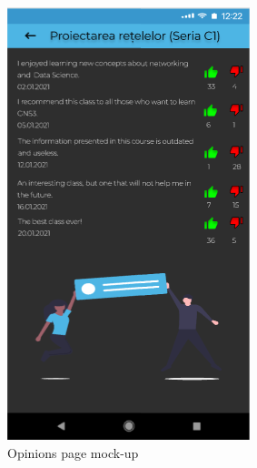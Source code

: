     \begin{figure}[!ht]
        \centering
        \begin{minipage}[t]{0.32\textwidth}
            \captionsetup{justification=centering}
            \includegraphics[width=\textwidth]{figures/app/initial/opinions.png}
            \caption{Opinions page mock-up}
            \label{4:fig:figma_opinions}
        \end{minipage}
        \hfill
        \begin{minipage}[t]{0.663\textwidth}

\end{minipage}
\end{figure}
